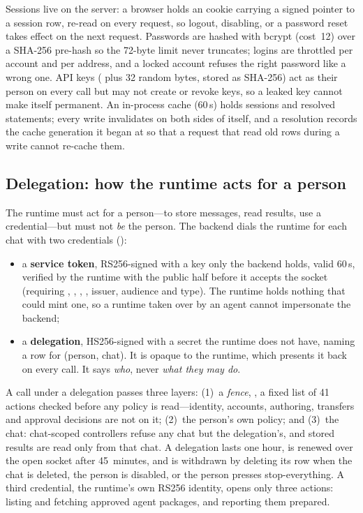 Sessions live on the server: a browser holds an  cookie
carrying a signed pointer to a session row, re-read on every request,
so logout, disabling, or a password reset takes effect on the next
request. Passwords are hashed with bcrypt (cost~12) over a SHA-256
pre-hash so the 72-byte limit never truncates; logins are throttled per
account and per address, and a locked account refuses the right
password like a wrong one. API keys ( plus 32 random bytes,
stored as SHA-256) act as their person on every call but may not create
or revoke keys, so a leaked key cannot make itself permanent. An
in-process cache (60\,s) holds sessions and resolved statements; every
write invalidates on both sides of itself, and a resolution records the
cache generation it began at so that a request that read old rows
during a write cannot re-cache them.

\subsection{Delegation: how the runtime acts for a person}
\label{sec:delegation}

The runtime must act for a person---to store messages, read results,
use a credential---but must not \emph{be} the person. The backend dials
the runtime for each chat with two credentials
():

\begin{itemize}
\item a \textbf{service token}, RS256-signed with a key only the
  backend holds, valid 60\,s, verified by the runtime with the public
  half before it accepts the socket (requiring , ,
  , , issuer, audience and type). The runtime holds
  nothing that could mint one, so a runtime taken over by an agent
  cannot impersonate the backend;
\item a \textbf{delegation}, HS256-signed with a secret the runtime does
  not have, naming a  row for (person, chat).
  It is opaque to the runtime, which presents it back on every call. It
  says \emph{who}, never \emph{what they may do}.
\end{itemize}

\noindent A call under a delegation passes three layers: (1)~a
\emph{fence}, , a fixed list of 41 actions
checked before any policy is read---identity, accounts, authoring,
transfers and approval decisions are not on it; (2)~the person's own
policy; and (3)~the chat: chat-scoped controllers refuse any chat but
the delegation's, and stored results are read only from that chat. A
delegation lasts one hour, is renewed over the open socket after
45~minutes, and is withdrawn by deleting its row when the chat is
deleted, the person is disabled, or the person presses
stop-everything. A third credential, the runtime's own RS256 identity,
opens only three actions: listing and fetching approved agent packages,
and reporting them prepared.

